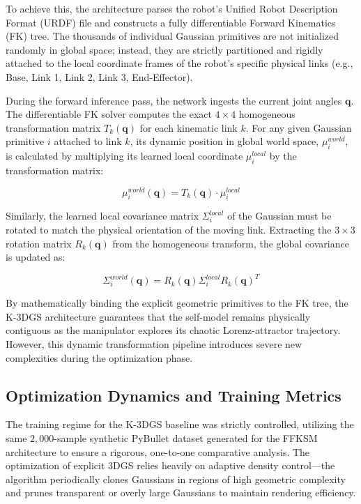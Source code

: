 \documentclass[12pt,a4paper,oneside]{report}
\begin{document}
To achieve this, the architecture parses the robot's Unified Robot Description Format (URDF) file and constructs a fully differentiable Forward Kinematics (FK) tree. The thousands of individual Gaussian primitives are not initialized randomly in global space; instead, they are strictly partitioned and rigidly attached to the local coordinate frames of the robot's specific physical links (e.g., Base, Link 1, Link 2, Link 3, End-Effector). 

During the forward inference pass, the network ingests the current joint angles $\mathbf{q}$. The differentiable FK solver computes the exact $4 \times 4$ homogeneous transformation matrix $T_k(\mathbf{q})$ for each kinematic link $k$. For any given Gaussian primitive $i$ attached to link $k$, its dynamic position in global world space, $\mu_i^{world}$, is calculated by multiplying its learned local coordinate $\mu_i^{local}$ by the transformation matrix:

\begin{equation}
\mu_i^{world}(\mathbf{q}) = T_k(\mathbf{q}) \cdot \mu_i^{local}
\end{equation}

Similarly, the learned local covariance matrix $\Sigma_i^{local}$ of the Gaussian must be rotated to match the physical orientation of the moving link. Extracting the $3 \times 3$ rotation matrix $R_k(\mathbf{q})$ from the homogeneous transform, the global covariance is updated as:

\begin{equation}
\Sigma_i^{world}(\mathbf{q}) = R_k(\mathbf{q}) \Sigma_i^{local} R_k(\mathbf{q})^T
\end{equation}

By mathematically binding the explicit geometric primitives to the FK tree, the K-3DGS architecture guarantees that the self-model remains physically contiguous as the manipulator explores its chaotic Lorenz-attractor trajectory. However, this dynamic transformation pipeline introduces severe new complexities during the optimization phase.

\subsection{Optimization Dynamics and Training Metrics}

The training regime for the K-3DGS baseline was strictly controlled, utilizing the same $2,000$-sample synthetic PyBullet dataset generated for the FFKSM architecture to ensure a rigorous, one-to-one comparative analysis. The optimization of explicit 3DGS relies heavily on adaptive density control—the algorithm periodically clones Gaussians in regions of high geometric complexity and prunes transparent or overly large Gaussians to maintain rendering efficiency.
\end{document}
